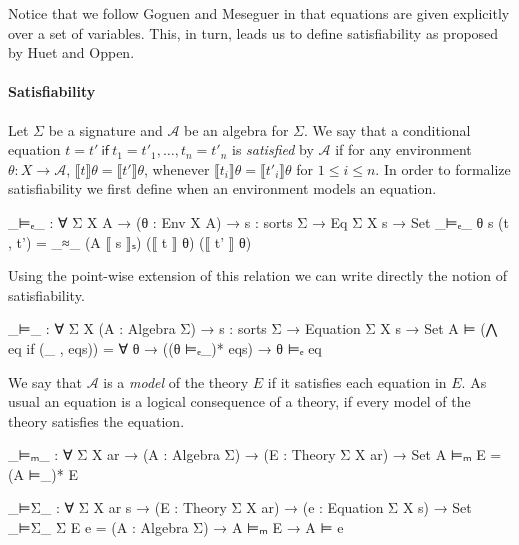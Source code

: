 \noindent Notice that we follow Goguen and Meseguer in that equations
are given explicitly over a set of variables. This, in turn, leads us
to define satisfiability as proposed by Huet and Oppen.

\paragraph*{Satisfiability} Let $\Sigma$ be a signature and
$\mathcal{A}$ be an algebra for $\Sigma$. We say that a conditional equation
$t = t'\ \mathsf{if}\ t_1 = t'_1,\ldots,t_n=t'_n$ is
\emph{satisfied} by $\mathcal{A}$ if for any
environment $\theta : X \to \mathcal{A}$, $⟦ t ⟧θ = ⟦ t' ⟧θ$, whenever
$⟦ t_i ⟧θ = ⟦ t'_i ⟧θ$ for $1 \leqslant i \leqslant n$. In order to
formalize satisfiability we first define when an environment models an
equation.
\begin{spec}
_⊨ₑ_ : ∀ {Σ X A} → (θ : Env X A) → {s : sorts Σ} → Eq Σ X s → Set
_⊨ₑ_ θ {s} (t , t') = _≈_ (A ⟦ s ⟧ₛ) (⟦ t ⟧ θ) (⟦ t' ⟧ θ)
\end{spec}
\noindent Using the point-wise extension of this relation we can write
directly the notion of satisfiability.
\begin{spec}
_⊨_ : ∀ {Σ X} (A : Algebra Σ) → {s : sorts Σ} → Equation Σ X s → Set
A ⊨ (⋀ eq if (_ , eqs)) = ∀ θ → ((θ ⊨ₑ_)* eqs) → θ ⊨ₑ eq
\end{spec}

\noindent We say that $\mathcal{A}$ is a \emph{model} of the theory
$E$ if it satisfies each equation in $E$. As usual an equation is a
logical consequence of a theory, if every model of the theory
satisfies the equation.
\begin{spec}
_⊨ₘ_ : ∀ {Σ X ar} → (A : Algebra Σ) → (E : Theory Σ X ar) → Set
A ⊨ₘ E = (A ⊨_)* E

_⊨Σ_ : ∀ {Σ X ar s} → (E : Theory Σ X ar) → (e : Equation Σ X s) → Set
_⊨Σ_ {Σ} E e = (A : Algebra Σ) → A ⊨ₘ E → A ⊨ e
\end{spec}%

